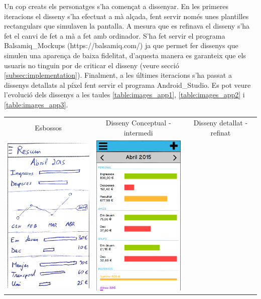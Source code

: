 Un cop creats els personatges s'ha començat a dissenyar. En les primeres iteracions el disseny s'ha efectuat a mà alçada, fent servir només unes plantilles rectangulars que simulaven la pantalla. A mesura que es refinava el disseny s'ha fet el canvi de fet a mà a fet amb ordinador. S'ha fet servir el programa \gls{Balsamiq_Mockups} (https://balsamiq.com/) ja que permet fer dissenys que simulen una aparença de baixa fidelitat, d'aquesta manera es garanteix que els usuaris no tinguin por de criticar el disseny (veure secció \ref{subsec:implementation}). Finalment, a les últimes iteracions s'ha passat a dissenys detallats al píxel fent servir el programa \gls{Android_Studio}. Es pot veure l'evolució dels dissenys a les taules \ref{table:images_app1}, \ref{table:images_app2} i \ref{table:images_app3}.

\begin{table}
\begin{tabular}{| c | c | c |}
\hline
Esbossos & Disseny Conceptual - intermedi & Disseny detallat - refinat \\
\includegraphics[width=50mm]{1_Dashboard.jpg} &
\includegraphics[width=50mm]{2_Dashboard.png} &

\end{tabular}
\end{table}
